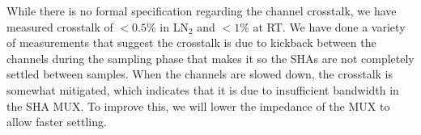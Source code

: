 \label{sec:5.7}


While there is no formal specification regarding the channel crosstalk, we have measured crosstalk of $<0.5\%$ in LN$_2$ and $<1\%$ at RT. We have done a variety of measurements that suggest the crosstalk is due to kickback between the channels during the sampling phase that makes it so the SHAs are not completely settled between samples. When the channels are slowed down, the crosstalk is somewhat mitigated, which indicates that it is due to insufficient bandwidth in the SHA MUX. To improve this, we will lower the impedance of the MUX to allow faster settling.
